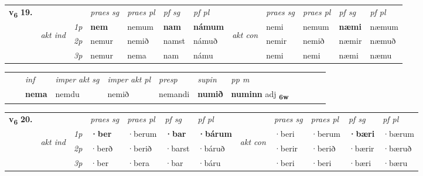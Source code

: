 \begin{tabular}{llllllllllll} \toprule
\multirow{4}{*}{{{\textbf{v{\textsubscript{6}}} \Large{\textbf{19.}}}}}  & &   &  \textit{praes sg}  & \textit{praes pl}  &\textit{ pf sg} & \textit{pf pl} &  &  \textit{praes sg}  & \textit{praes pl}  & \textit{pf sg} & \textit{pf pl } \\*
	\cmidrule{4-7} \cmidrule{9-12}
 & \multirow{3}{*}{\begin{turn}{90}\textit{akt ind}\end{turn}} & {\textit{1p}} & \textbf{nem} & nemum    & \textbf{nam} & \textbf{námum} & \multirow{3}{*}{\begin{turn}{90}\textit{akt con}\end{turn}} &nemi & nemum & \textbf{næmi} & næmum\\*
& &  {\textit{2p}} &  nemur  & nemið   & namst & námuð & & nemir & nemið & næmir & næmuð \\*
& &  {\textit{3p}} & nemur & nema   & nam & námu & & nemi & nemi& næmi & næmu  \\*
\cmidrule{4-7} \cmidrule{9-12}
\end{tabular}


\begin{tabular}{llllllllllll}
 & & \textit{inf} & \textit{imper akt sg} & \textit{imper akt pl}   & \textit{presp} & \textit{supin}  & \textit{pp m}     \\*
  & & \textbf{nema} & nemdu  & nemið   & nemandi &  \textbf{numið}  & \textbf{numinn} adj \textbf{\textsubscript{6w}} \\*
\cmidrule{1-12}
\end{tabular}



\begin{tabular}{llllllllllll} \toprule
\multirow{4}{*}{{{\textbf{v{\textsubscript{6}}} \Large{\textbf{20.}}}}}  & &   &  \textit{praes sg}  & \textit{praes pl}  &\textit{ pf sg} & \textit{pf pl} &  &  \textit{praes sg}  & \textit{praes pl}  & \textit{pf sg} & \textit{pf pl } \\*
	\cmidrule{4-7} \cmidrule{9-12}
 & \multirow{3}{*}{\begin{turn}{90}\textit{akt ind}\end{turn}} & {\textit{1p}} & \textbf{·ber} & ·berum    & \textbf{·bar} & \textbf{·bárum} & \multirow{3}{*}{\begin{turn}{90}\textit{akt con}\end{turn}} &·beri & ·berum & \textbf{·bæri} & ·bærum\\*
& &  {\textit{2p}} &  ·berð  & ·berið   & ·barst & ·báruð & & ·berir & ·berið & ·bærir & ·bæruð \\*
& &  {\textit{3p}} & ·ber & ·bera   & ·bar & ·báru & & ·beri & ·beri& ·bæri & ·bæru  \\*
\cmidrule{4-7} \cmidrule{9-12}
\end{tabular}


